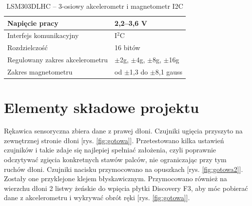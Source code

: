\documentclass[12pt,a4paper]{article}
\begin{document}
\begin{table}[!htb]
\centering
\begin{tabularx}
{\textwidth}{ |X|X| }
\hline
Napięcie pracy & 2,2--3,6 V \\
\hline
Interfejs komunikacyjny & I$^2$C \\
\hline
Rozdzielczość & 16 bitów \\
\hline
Regulowany zakres akcelerometru &  $\pm$2g, $\pm$4g, $\pm$8g, $\pm$16g \\ 
\hline
Zakres magnetometru &  od $\pm$1,3 do $\pm$8,1 gauss \\ 
\hline
\end{tabularx}
\caption{LSM303DLHC -- 3-osiowy akcelerometr i magnetometr I2C}
\label{table:tabela_akcelerometr}
\end{table}

\section{Elementy składowe projektu}
Rękawica sensoryczna zbiera dane z prawej dłoni. Czujniki ugięcia przyszyto na zewnętrznej stronie dłoni [rys. \ref{fig:gotowa}].
 Przetestowano kilka ustawień czujników i takie zdaje się najlepiej spełniać założenia, czyli poprawnie odczytywać zgięcia konkretnych stawów palców, nie ograniczając przy tym ruchów dłoni. Czujniki nacisku przymocowano na opuszkach [rys. \ref{fig:gotowa2}]. Zostały one przyklejone klejem błyskawicznym. Przymocowano również na wierzchu dłoni 2 listwy żeńskie do wpięcia płytki Discovery F3, aby móc pobierać dane z akcelerometru i wykrywać obrót ręki [rys. \ref{fig:gotowa}].
 
\end{document}
